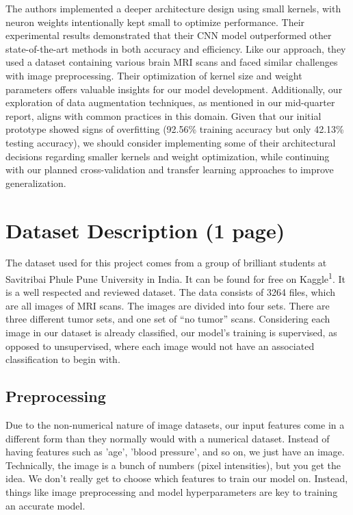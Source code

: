 \documentclass[conference]{IEEEtran}
\begin{document}
The authors implemented a deeper architecture design using small kernels, with neuron weights intentionally kept small to optimize performance. Their experimental results demonstrated that their CNN model outperformed other state-of-the-art methods in both accuracy and efficiency. Like our approach, they used a dataset containing various brain MRI scans and faced similar challenges with image preprocessing. Their optimization of kernel size and weight parameters offers valuable insights for our model development. Additionally, our exploration of data augmentation techniques, as mentioned in our mid-quarter report, aligns with common practices in this domain. Given that our initial prototype showed signs of overfitting (92.56\% training accuracy but only 42.13\% testing accuracy), we should consider implementing some of their architectural decisions regarding smaller kernels and weight optimization, while continuing with our planned cross-validation and transfer learning approaches to improve generalization.


\section{Dataset Description (1 page)}

The dataset used for this project comes from a group of brilliant students at Savitribai Phule Pune University in India. It can be found for free on Kaggle\textsuperscript{1}. It is a well respected and reviewed dataset. The data consists of 3264 files, which are all images of MRI scans. The images are divided into four sets. There are three different tumor sets, and one set of “no tumor” scans. Considering each image in our dataset is already classified, our model's training is supervised, as opposed to unsupervised, where each image would not have an associated classification to begin with.

\subsection{Preprocessing}

Due to the non-numerical nature of image datasets, our input features come in a different form than they normally would with a numerical dataset. Instead of having features such as 'age', 'blood pressure', and so on, we just have an image. Technically, the image is a bunch of numbers (pixel intensities), but you get the idea. We don't really get to choose which features to train our model on. Instead, things like image preprocessing and model hyperparameters are key to training an accurate model. 
\end{document}
